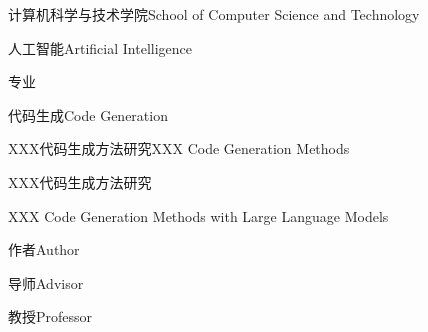 \school
{计算机科学与技术学院}{School of Computer Science and Technology}

\major
{人工智能}{Artificial Intelligence}

\degreetype
{专业}

\direct
{代码生成}{Code Generation}

\thesistitle
{XXX代码生成方法研究}{XXX Code Generation Methods}

\coverthesistitlech
{XXX代码生成方法研究}
{}

\coverthesistitleeng
{XXX Code Generation Methods}
{with Large Language Models}

\thesisauthor
{作者}{Author}

\teacher
{导师}{Advisor}

\teacherdegree
{教授}{Professor}

\subteacher
{}{}

\subteacherdegree
{}{}





